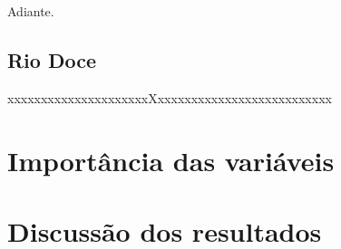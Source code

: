 Adiante.

\subsection{Rio Doce}

xxxxxxxxxxxxxxxxxxxxxXxxxxxxxxxxxxxxxxxxxxxxxxxx

\section{Importância das variáveis}

\section{Discuss\~ao dos resultados}
